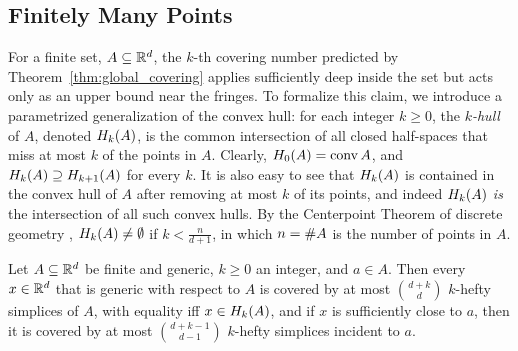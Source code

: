 \documentclass[a4paper,UKenglish,cleveref, autoref,numberwithinsect]{socg-lipics-v2021}
\newcommand {\mm}[1] {\ifmmode{#1}\else{\mbox{\(#1\)}}\fi}
\theoremstyle{plain}
\newcommand{\Rspace}        {\mm{{\mathbb R}}}
\newcommand{\Hull}[2]       {\mm{{H}_{#1}{({#2})}}}
\newcommand{\card}[1]       {\mm{{\#}{#1}}}
\newcommand{\conv}[1]       {\mm{{\rm conv\,}{#1}}}
\begin{document}
\subsection{Finitely Many Points}
\label{sec:2.4}
For a finite set, $A \subseteq \Rspace^d$, the $k$-th covering number predicted by Theorem~\ref{thm:global_covering} applies sufficiently deep inside the set but acts only as an upper bound near the fringes.
To formalize this claim, we introduce a parametrized generalization of the convex hull: for each integer $k \geq 0$, the \emph{$k$-hull} of $A$, denoted $\Hull{k}{A}$, is the common intersection of all closed half-spaces that miss at most $k$ of the points in $A$.
Clearly, $\Hull{0}{A} = \conv{A}$, and $\Hull{k}{A} \supseteq \Hull{k+1}{A}$ for every $k$.
It is also easy to see that $\Hull{k}{A}$ is contained in the convex hull of $A$ after removing at most $k$ of its points, and indeed $\Hull{k}{A}$ \emph{is} the intersection of all such convex hulls.
By the Centerpoint Theorem of discrete geometry \cite[Section~4.1]{Ede87}, $\Hull{k}{A} \neq \emptyset$ if $k < \frac{n}{d+1}$, in which $n = \card{A}$ is the number of points in $A$.
\begin{theorem}
  \label{thm:covering_for_finite_sets}
  Let $A \subseteq \Rspace^d$ be finite and generic, $k \geq 0$ an integer, and $a \in A$.
  Then every $x \in \Rspace^d$ that is generic with respect to $A$ is covered by at most $\binom{d+k}{d}$ $k$-hefty simplices of $A$, with equality iff $x \in \Hull{k}{A}$, and if $x$ is sufficiently close to $a$, then it is covered by at most $\binom{d+k-1}{d-1}$ $k$-hefty simplices incident to $a$.
\end{theorem}
\end{document}
